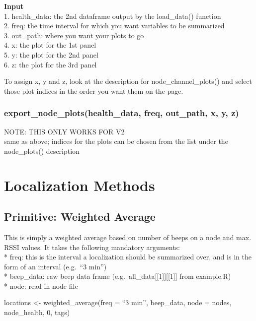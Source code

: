 \documentclass[
]{book}
\begin{document}
\textbf{Input}\\
1. health\_data: the 2nd dataframe output by the load\_data() function\\
2. freq: the time interval for which you want variables to be summarized\\
3. out\_path: where you want your plots to go\\
4. x: the plot for the 1st panel\\
5. y: the plot for the 2nd panel\\
6. z: the plot for the 3rd panel

To assign x, y and z, look at the description for node\_channel\_plots() and select those plot indices in the order you want them on the page.

\hypertarget{export_node_plotshealth_data-freq-out_path-x-y-z}{%
\subsection{export\_node\_plots(health\_data, freq, out\_path, x, y, z)}\label{export_node_plotshealth_data-freq-out_path-x-y-z}}

NOTE: THIS ONLY WORKS FOR V2\\
same as above; indices for the plots can be chosen from the list under the node\_plots() description

\hypertarget{localization-methods}{%
\chapter{Localization Methods}\label{localization-methods}}

\hypertarget{primitive-weighted-average}{%
\section{Primitive: Weighted Average}\label{primitive-weighted-average}}

This is simply a weighted average based on number of beeps on a node and max. RSSI values. It takes the following mandatory arguments:\\
* freq: this is the interval a localization should be summarized over, and is in the form of an interval (e.g.~``3 min'')\\
* beep\_data: raw beep data frame (e.g.~all\_data{[}{[}1{]}{]}{[}{[}1{]}{]} from example.R)\\
* node: read in node file

locations \textless- weighted\_average(freq = ``3 min'', beep\_data, node = nodes, node\_health, 0, tags)
\end{document}
